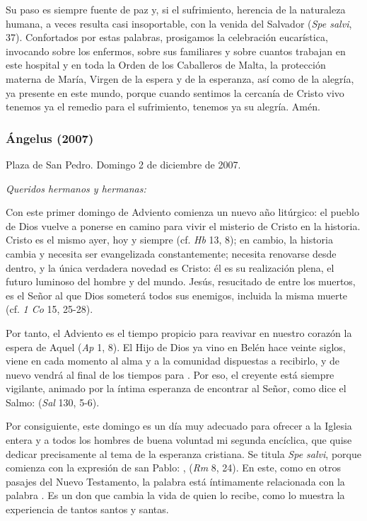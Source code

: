 Su paso es siempre fuente de paz y, si el sufrimiento, herencia de la naturaleza humana, a veces resulta casi insoportable, con la venida del Salvador  (\emph{Spe salvi}, 37). Confortados por estas palabras, prosigamos la celebración eucarística, invocando sobre los enfermos, sobre sus familiares y sobre cuantos trabajan en este hospital y en toda la Orden de los Caballeros de Malta, la protección materna de María, Virgen de la espera y de la esperanza, así como de la alegría, ya presente en este mundo, porque cuando sentimos la cercanía de Cristo vivo tenemos ya el remedio para el sufrimiento, tenemos ya su alegría. Amén.


\subsubsection{Ángelus (2007)}

Plaza de San Pedro. Domingo 2 de diciembre de 2007.

\emph{Queridos hermanos y hermanas:}

Con este primer domingo de Adviento comienza un nuevo año litúrgico: el pueblo de Dios vuelve a ponerse en camino para vivir el misterio de Cristo en la historia. Cristo es el mismo ayer, hoy y siempre (cf. \emph{Hb} 13, 8); en cambio, la historia cambia y necesita ser evangelizada constantemente; necesita renovarse desde dentro, y la única verdadera novedad es Cristo: él es su realización plena, el futuro luminoso del hombre y del mundo. Jesús, resucitado de entre los muertos, es el Señor al que Dios someterá todos sus enemigos, incluida la misma muerte (cf. \emph{1 Co} 15, 25-28).

Por tanto, el Adviento es el tiempo propicio para reavivar en nuestro corazón la espera de Aquel  (\emph{Ap} 1, 8). El Hijo de Dios ya vino en Belén hace veinte siglos, viene en cada momento al alma y a la comunidad dispuestas a recibirlo, y de nuevo vendrá al final de los tiempos para . Por eso, el creyente está siempre vigilante, animado por la íntima esperanza de encontrar al Señor, como dice el Salmo:  (\emph{Sal} 130, 5-6).

Por consiguiente, este domingo es un día muy adecuado para ofrecer a la Iglesia entera y a todos los hombres de buena voluntad mi segunda encíclica, que quise dedicar precisamente al tema de la esperanza cristiana. Se titula \emph{Spe salvi}, porque comienza con la expresión de san Pablo: \emph{},  (\emph{Rm} 8, 24). En este, como en otros pasajes del Nuevo Testamento, la palabra  está íntimamente relacionada con la palabra . Es un don que cambia la vida de quien lo recibe, como lo muestra la experiencia de tantos santos y santas.

